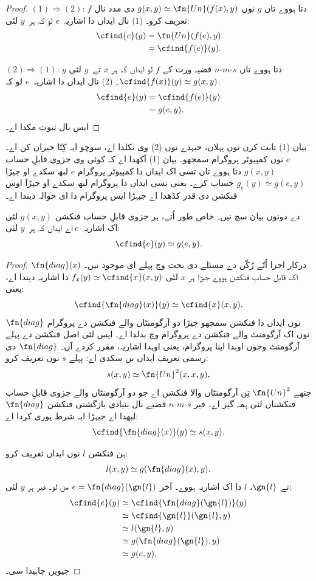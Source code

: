 \documentclass[../../../include/open-logic-section]{subfiles}
\begin{document}
\begin{proof}
$(1) \Rightarrow (2)$:
$f$ دتا ہووے تاں
$g$ نوں $g(x,y) \simeq
\fn{Un}(f(x),y)$
دی مدد نال تعریف کرو۔
(1) نال ایداں دا
اشاریہ~$e$ لو کہ
ہر~$y$ لئی:
\begin{align*}
\cfind{e}(y) & = \fn{Un}(f(e),y) \\
& = \cfind{f(e)}(y).
\end{align*}

$(2) \Rightarrow (1)$:
$g$ دتا ہووے تاں
$s$-$m$-$n$ قضیہ
ورت کے $f$ لو
ایداں کہ ہر $x$
تے~$y$ لئی
$\cfind{f(x)}(y) \simeq g(x,y)$۔
(2) نال ایداں دا
اشاریہ~$e$ لو کہ:
\begin{align*}
\cfind{e}(y) & = \cfind{f(e)}(y) \\
& = g(e,y).
\end{align*}
ایس نال ثبوت
مکدا اے۔
\end{proof}

\begin{explain}
بیان (1) ثابت کرن توں پہلاں، جیہدے توں
(2) وی نکلدا اے، سوچو ایہ کِنّا حیران کن اے۔
$e$ نوں کمپیوٹر
پروگرام سمجھو۔
بیان (1) آکھدا
اے کہ کوئی وی
جزوی قابلِ حساب
$g(x,y)$ دتا
ہووے تاں تسی
اک ایداں دا
کمپیوٹر پروگرام
$e$ لبھ سکدے
او جیڑا
$g_e(y) \simeq g(e,y)$
حساب کرے۔
یعنی تسی ایداں
دا پروگرام لبھ
سکدے او جیڑا اوس فنکشن دی قدر
کڈھدا اے جیہڑا ایس پروگرام دا ای حوالہ دیندا اے۔
\end{explain}

\begin{thm}
دے دونوں بیان
سچ نیں۔ خاص طور
اُتے، ہر جزوی
قابلِ حساب فنکشن
$g(x,y)$ لئی اک
اشاریہ~$e$ اے
ایداں کہ ہر~$y$
لئی:
\[
\cfind{e}(y) \simeq g(e,y).
\]
\end{thm}

\begin{proof}
درکار اجزا اُتّے
رُکّن دے مسئلے
دی بحث وچ پہلے
ای موجود نیں۔
$\fn{diag}(x)$
اک قابلِ حساب
فنکشن ہووے جیڑا
ہر $x$ لئی
$f_x(y) \simeq \cfind{x}(x,y)$
دا اشاریہ دیندا
اے، یعنی:
\[
\cfind{\fn{diag}(x)}(y) \simeq \cfind{x}(x,y).
\]
$\fn{diag}$ نوں
ایداں دا فنکشن
سمجھو جیڑا دو
آرگومنٹاں والے
فنکشن دے پروگرام
نوں اک آرگومنٹ
والے فنکشن دے
پروگرام وچ بدلدا
اے۔ ایس لئی اصل فنکشن دے پہلے آرگومنٹ
وجوں اوہدا اپنا پروگرام، یعنی اوہدا اشاریہ،
مقرر کردے آں۔ $\fn{diag}$
دی رسمی تعریف
ایداں بن سکدی
اے: پہلے $s$
نوں تعریف کرو:
\[
s(x,y) \simeq \fn{Un}^2(x,x,y),
\]
جتھے $\fn{Un}^2$
تِن آرگومنٹاں
والا فنکشن اے
جو دو آرگومنٹاں
والے جزوی قابلِ
حساب فنکشناں
لئی ہمہ گیر اے۔
فیر $s$-$m$-$n$
قضیے نال بنیادی
بازگشتی فنکشن
$\fn{diag}$ لبھدا
اے جیہڑا ایہ
شرط پوری کردا
اے:
\[
\cfind{\fn{diag}(x)}(y) \simeq s(x,y).
\]

ہن فنکشن $l$
نوں ایداں
تعریف کرو:
\[
l(x,y) \simeq g(\fn{diag}(x),y).
\]
تے $\gn{l}$،
$l$ دا اک
اشاریہ ہووے۔
آخر $e = \fn{diag}(\gn{l})$
من لو۔ فیر
ہر $y$ لئی:
\begin{align*}
\cfind{e}(y) & \simeq \cfind{\fn{diag}(\gn{l})}(y) \\
& \simeq \cfind{\gn{l}}(\gn{l}, y) \\
& \simeq l(\gn{l}, y) \\
& \simeq g(\fn{diag}(\gn{l}),y) \\
& \simeq g(e, y),
\end{align*}
جیویں چاہیدا سی۔
\end{proof}
\end{document}

